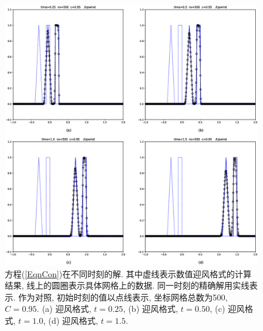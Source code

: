 \documentclass[10.5pt
]{article}
\begin{document}
\begin{figure}[htb]
	\centering
	\includegraphics[width=\textwidth]{hw2_1_time.eps}
	\caption{方程(\ref{EqnCon})在不同时刻的解. 其中虚线表示数值迎风格式的计算结果, 线上的圆圈表示具体网格上的数据. 同一时刻的精确解用实线表示. 作为对照, 初始时刻的值以点线表示, 坐标网格总数为500, $C = 0.95$. (a) 迎风格式, $t = 0.25$, (b)  迎风格式, $t = 0.50$, (c)  迎风格式, $t = 1.0$, (d) 迎风格式, $t = 1.5$.}  \label{fig13}
\end{figure}
\end{document}
